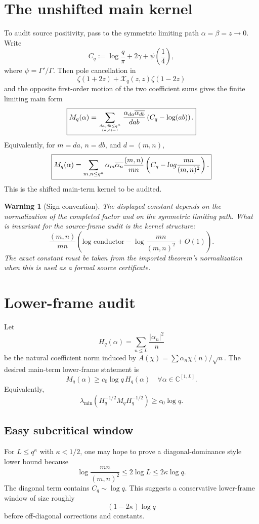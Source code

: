 \documentclass[11pt]{article}
\newtheorem{warning}{Warning}
\begin{document}
\section{The unshifted main kernel}
To audit source positivity, pass to the symmetric limiting path $\alpha=\beta=z\to0$.  Write
\[
C_q:=\log\frac q\pi+2\gamma+\psi\left(\frac14\right),
\]
where $\psi=\Gamma'/\Gamma$.  Then pole cancellation in
\[
\zeta(1+2z)+\mathcal X_q(z,z)\zeta(1-2z)
\]
and the opposite first-order motion of the two coefficient sums gives the finite limiting main form
\[
\boxed{
M_q(\alpha)=
\sum_{da,db\le q^\kappa\atop (a,b)=1}
\frac{\alpha_{da}\overline{\alpha_{db}}}{dab}
\left(C_q-\log(ab)\right).
}
\]
Equivalently, for $m=da$, $n=db$, and $d=(m,n)$,
\[
\boxed{
M_q(\alpha)=
\sum_{m,n\le q^\kappa}
\alpha_m\overline{\alpha_n}
\frac{(m,n)}{mn}
\left(C_q-\\log\frac{mn}{(m,n)^2}\right).
}
\]
This is the shifted main-term kernel to be audited.

\begin{warning}[Sign convention]
The displayed constant depends on the normalization of the completed factor and on the symmetric limiting path.  What is invariant for the source-frame audit is the kernel structure:
\[
\frac{(m,n)}{mn}\left(\text{log conductor} - \log\frac{mn}{(m,n)^2}+O(1)\right).
\]
The exact constant must be taken from the imported theorem's normalization when this is used as a formal source certificate.
\end{warning}

\section{Lower-frame audit}
Let
\[
H_q(\alpha)=\sum_{n\le L}\frac{|\alpha_n|^2}{n}
\]
be the natural coefficient norm induced by $A(\chi)=\sum \alpha_n\chi(n)/\sqrt n$.  The desired main-term lower-frame statement is
\[
\boxed{
M_q(\alpha)\ge c_0\log q\, H_q(\alpha)
\quad\forall \alpha\in\mathbb C^{[1,L]}.
}
\]
Equivalently,
\[
\lambda_{\min}\left(H_q^{-1/2}M_qH_q^{-1/2}\right)
\ge c_0\log q.
\]

\subsection{Easy subcritical window}
For $L\le q^\kappa$ with $\kappa<1/2$, one may hope to prove a diagonal-dominance style lower bound because
\[
\log\frac{mn}{(m,n)^2}\le 2\log L\le 2\kappa\log q.
\]
The diagonal term contains $C_q\sim \log q$.  This suggests a conservative lower-frame window of size roughly
\[
(1-2\kappa)\log q
\]
before off-diagonal corrections and constants.
\end{document}
